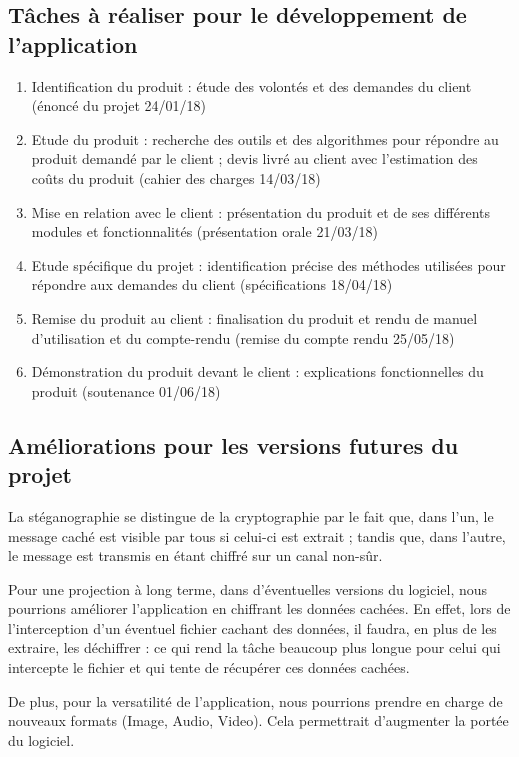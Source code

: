 \documentclass[11pt]{article}
\begin{document}
\subsection{Tâches à réaliser pour le développement de l'application}
\begin {enumerate}
\item Identification du produit : étude des volontés et des demandes du client (énoncé du projet 24/01/18)
\item Etude du produit : recherche des outils et des algorithmes pour répondre au produit demandé par le client ; 
devis livré au client avec l'estimation des coûts du produit (cahier des charges 14/03/18)
\item Mise en relation avec le client : présentation du produit et de ses différents modules et fonctionnalités (présentation orale 21/03/18)
\item Etude spécifique du projet : identification précise des méthodes utilisées pour répondre aux demandes du client (spécifications 18/04/18)
\item Remise du produit au client : finalisation du produit et rendu de manuel d'utilisation et du compte-rendu (remise du compte rendu 25/05/18)
\item Démonstration du produit devant le client : explications fonctionnelles du produit (soutenance 01/06/18)
\end{enumerate}

\subsection{Améliorations pour les versions futures du projet}
La stéganographie se distingue de la cryptographie par le fait que, dans l'un, le message caché est visible par tous si celui-ci est extrait ; tandis que, dans l'autre, 
le message est transmis en étant chiffré sur un canal non-sûr. 

Pour une projection à long terme, dans d'éventuelles versions du logiciel, nous pourrions améliorer l'application en chiffrant les données cachées. 
En effet, lors de l'interception d'un éventuel fichier cachant des données, il faudra, en plus de les extraire, les déchiffrer : ce qui rend la tâche beaucoup plus longue
pour celui qui intercepte le fichier et qui tente de récupérer ces données cachées. 

De plus, pour la versatilité de l'application, nous pourrions prendre en charge de nouveaux formats (Image, Audio, Video). Cela permettrait d'augmenter la 
portée du logiciel. 
\end{document}
